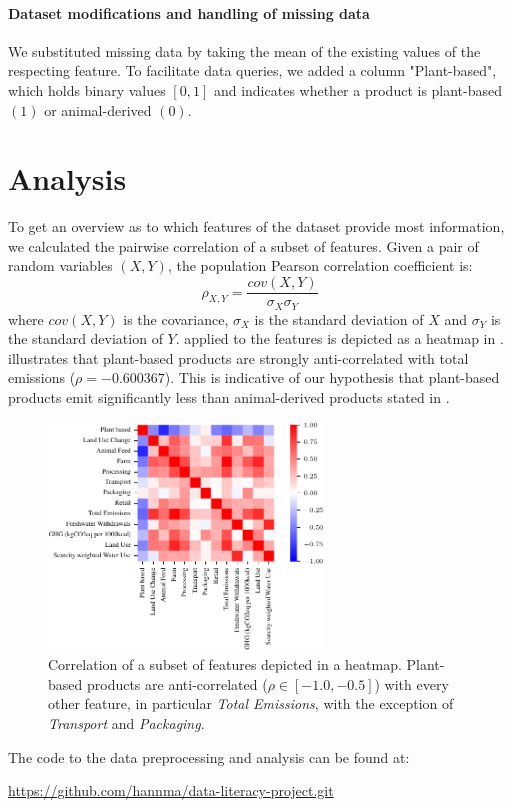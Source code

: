 \documentclass{article}
\begin{document}
\paragraph{Dataset modifications and handling of missing data}

We substituted  missing  data by taking the mean of the existing values of the respecting feature. To facilitate data queries, we added a column "Plant-based", which holds binary values $[0,1]$ and indicates whether a product is plant-based $(1)$ or animal-derived $(0)$.


\section{Analysis}
\label{analysis}

To get an overview as to which features of the dataset provide most information, we calculated the pairwise correlation of a subset of features. Given a pair of random variables $(X,Y)$, the population Pearson correlation coefficient is: 
\begin{equation} \label{eq:corr}
  \rho_{X,Y} = \frac{cov(X,Y)}{\sigma_X \sigma_Y}
\end{equation}
where $cov(X,Y)$ is the covariance, $\sigma_X$ is the standard deviation of $X$ and $\sigma_Y$ is the standard deviation of $Y$.
 applied to the features is depicted  as a heatmap in  .   illustrates that
plant-based products are strongly anti-correlated with total emissions ($\rho =  -0.600367$).%
This is indicative of our hypothesis that plant-based products emit significantly less than animal-derived products stated in  .


\begin{figure}[h]
  \centering
  \includegraphics[width=0.65\textwidth]{figures/heat-map.pdf}
  \caption{Correlation of a subset of features depicted in a heatmap. Plant-based products are  anti-correlated ($\rho \in [-1.0, -0.5]$) with every other feature, in particular \textit{Total Emissions}, with the  exception of \textit{Transport} and \textit{Packaging}.}
  \label{fig:corr}
\end{figure}
The code to the data preprocessing and analysis can be found at: \par
\centerline{\url{https://github.com/hannma/data-literacy-project.git}}
\end{document}

